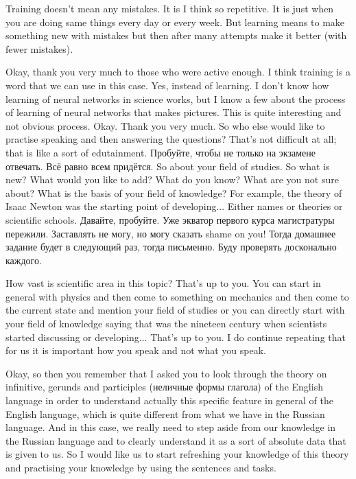 \documentclass[main.tex]{subfiles}
\begin{document}
Training doesn't mean any mistakes.
It is I think so repetitive.
It is just when you are doing same things every day or every week.
But learning means to make something new with mistakes but then after many attempts make it better (with fewer mistakes).

Okay, thank you very much to those who were active enough.
I think training is a word that we can use in this case.
Yes, instead of learning.
I don't know how learning of neural networks in science works, but I know a few about the process of learning of neural networks that makes pictures.
This is quite interesting and not obvious process.
Okay.
Thank you very much.
So who else would like to practise speaking and then answering the questions?
That's not difficult at all; that is like a sort of edutainment.
Пробуйте, чтобы не только на экзамене отвечать.
Всё равно всем придётся.
So about your field of studies.
So what is new?
What would you like to add?
What do you know?
What are you not sure about?
What is the basis of your field of knowledge?
For example, the theory of Isaac Newton was the starting point of developing...
Either names or theories or scientific schools.
Давайте, пробуйте.
Уже экватор первого курса магистратуры пережили.
Заставлять не могу, но могу сказать shame on you!
Тогда домашнее задание будет в следующий раз, тогда письменно.
Буду проверять досконально каждого.

How vast is scientific area in this topic?
That's up to you.
You can start in general with physics and then come to something on mechanics and then come to the current state and mention your field of studies or you can directly start with your field of knowledge saying that was the nineteen century when scientists started discussing or developing...
That's up to you.
I do continue repeating that for us it is important how you speak and not what you speak.


\newpage
{}

Okay, so then you remember that I asked you to look through the theory on infinitive, gerunds and participles (неличные формы глагола) of the English language in order to understand actually this specific feature in general of the English language, which is quite different from what we have in the Russian language.
And in this case, we really need to step aside from our knowledge in the Russian language and to clearly understand it as a sort of absolute data that is given to us.
So I would like us to start refreshing your knowledge of this theory and practising your knowledge by using the sentences and tasks.
\end{document}
